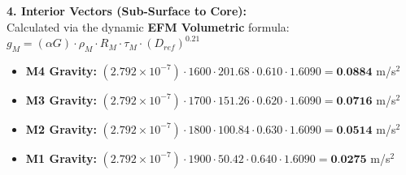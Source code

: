 \documentclass[11pt, a4paper]{article}
\begin{document}
  \vspace{0.5em}
  \noindent \textbf{4. Interior Vectors (Sub-Surface to Core):} \\[0.5em]
  \hspace*{1em} Calculated via the dynamic \textbf{EFM Volumetric} formula: $g_M = (\alpha G) \cdot \rho_{M} \cdot R_M \cdot \tau_M \cdot (D_{ref})^{0.21}$
  \begin{itemize}
    \item \textbf{M4 Gravity:} $(2.792 \times 10^{-7}) \cdot 1600 \cdot 201.68 \cdot 0.610 \cdot 1.6090 = \textbf{0.0884}$ m/s$^2$
    \item \textbf{M3 Gravity:} $(2.792 \times 10^{-7}) \cdot 1700 \cdot 151.26 \cdot 0.620 \cdot 1.6090 = \textbf{0.0716}$ m/s$^2$
    \item \textbf{M2 Gravity:} $(2.792 \times 10^{-7}) \cdot 1800 \cdot 100.84 \cdot 0.630 \cdot 1.6090 = \textbf{0.0514}$ m/s$^2$
    \item \textbf{M1 Gravity:} $(2.792 \times 10^{-7}) \cdot 1900 \cdot 50.42 \cdot 0.640 \cdot 1.6090 = \textbf{0.0275}$ m/s$^2$
  \end{itemize}
\end{document}

